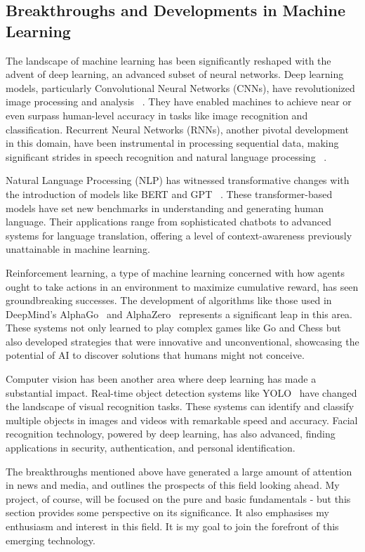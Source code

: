 \documentclass[letterpaper,10pt]{article}
\begin{document}
\subsection{Breakthroughs and Developments in Machine Learning} \label{beyondscopefinish}
The landscape of machine learning has been significantly reshaped with the advent of deep learning, an advanced subset of neural networks. Deep learning models, particularly Convolutional Neural Networks (CNNs), have revolutionized image processing and analysis ~\cite{CNNImageClassification}. They have enabled machines to achieve near or even surpass human-level accuracy in tasks like image recognition and classification. Recurrent Neural Networks (RNNs), another pivotal development in this domain, have been instrumental in processing sequential data, making significant strides in speech recognition and natural language processing~\cite{RNNSequentialLearning} .\par
Natural Language Processing (NLP) has witnessed transformative changes with the introduction of models like BERT and GPT ~\cite{BERT_NLP, NLP_Transformer}. These transformer-based models have set new benchmarks in understanding and generating human language. Their applications range from sophisticated chatbots to advanced systems for language translation, offering a level of context-awareness previously unattainable in machine learning. \par
Reinforcement learning, a type of machine learning concerned with how agents ought to take actions in an environment to maximize cumulative reward, has seen groundbreaking successes. The development of algorithms like those used in DeepMind's AlphaGo~\cite{AlphaGoDeepMind} and AlphaZero~\cite{AlphaZeroDeepMind} represents a significant leap in this area. These systems not only learned to play complex games like Go and Chess but also developed strategies that were innovative and unconventional, showcasing the potential of AI to discover solutions that humans might not conceive. \par
Computer vision has been another area where deep learning has made a substantial impact. Real-time object detection systems like YOLO~\cite{YOLODetection} have changed the landscape of visual recognition tasks. These systems can identify and classify multiple objects in images and videos with remarkable speed and accuracy. Facial recognition technology, powered by deep learning, has also advanced, finding applications in security, authentication, and personal identification. \par
The breakthroughs mentioned above have generated a large amount of attention in news and media, and outlines the prospects of this field looking ahead. My project, of course, will be focused on the pure and basic fundamentals - but this section provides some perspective on its significance. It also emphasises my enthusiasm and interest in this field. It is my goal to join the forefront of this emerging technology.
\end{document}
